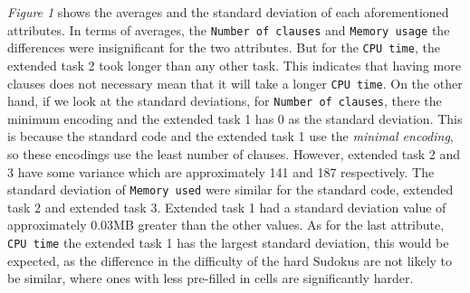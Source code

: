 \documentclass[12pt]{article}
\begin{document}
\textit{Figure 1} shows the averages and the standard deviation of each aforementioned attributes. In terms of averages, the \texttt{Number of clauses} and \texttt{Memory usage} the differences were insignificant for the two attributes. But for the \texttt{CPU time}, the extended task 2 took longer than any other task. This indicates that having more clauses does not necessary mean that it will take a longer \texttt{CPU time}. On the other hand, if we look at the standard deviations, for \texttt{Number of clauses}, there the minimum encoding and the extended task 1 has 0 as the standard deviation. This is because the standard code and the extended task 1 use the \textit{minimal encoding}, so these encodings use the least number of clauses. However, extended task 2 and 3 have some variance which are approximately 141 and 187 respectively. The standard deviation of \texttt{Memory used} were similar for the standard code, extended task 2 and extended task 3. Extended task 1 had a standard deviation value of approximately 0.03MB greater than the other values. As for the last attribute, \texttt{CPU time} the extended task 1 has the largest standard deviation, this would be expected, as the difference in the difficulty of the hard Sudokus are not likely to be similar, where ones with less pre-filled in cells are significantly harder.
\end{document}
